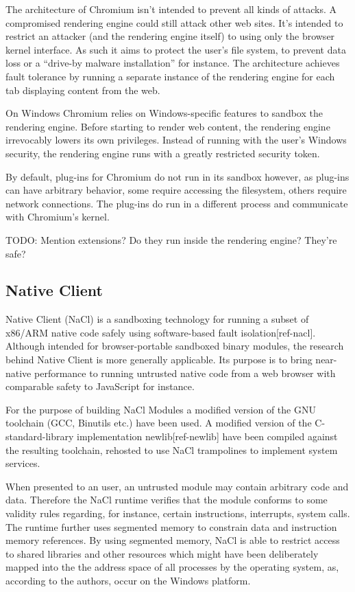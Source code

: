 The architecture of Chromium isn't intended to prevent all kinds of attacks.
A compromised rendering engine could still attack other web sites.
It's intended to restrict an attacker (and the rendering engine itself) to using
only the browser kernel interface. As such it aims to protect the user's file
system, to prevent data loss or a ``drive-by malware installation'' for
instance. The architecture achieves fault tolerance by running a separate
instance of the rendering engine for each tab displaying content from the web.

On Windows Chromium relies on Windows-specific features to sandbox the rendering
engine.
Before starting to render web content, the rendering engine irrevocably lowers
its own privileges.
Instead of running with the user's Windows security, the rendering engine runs
with a greatly restricted security token.

By default, plug-ins for Chromium do not run in its sandbox however, as
plug-ins can have arbitrary behavior, some require accessing the filesystem,
others require network connections.
The plug-ins do run in a different process and communicate with Chromium's
kernel.

TODO: Mention extensions? Do they run inside the rendering engine? They're safe?

\subsection {Native Client}

Native Client (NaCl) is a sandboxing technology for running a subset of x86/ARM
native code safely using software-based fault isolation[ref-nacl].
Although intended for browser-portable sandboxed binary modules, the research
behind Native Client is more generally applicable.
Its purpose is to bring near-native performance to running untrusted native code
from a web browser with comparable safety to JavaScript for instance.

For the purpose of building NaCl Modules a modified version of the GNU toolchain
(GCC, Binutils etc.) have been used. A modified version of the
C-standard-library implementation newlib[ref-newlib] have been compiled against
the resulting toolchain, rehosted to use NaCl trampolines to implement system
services.

When presented to an user, an untrusted module may contain arbitrary code and
data.
Therefore the NaCl runtime verifies that the module conforms to some validity
rules regarding, for instance, certain instructions, interrupts, system calls.
The runtime further uses segmented memory to constrain data and instruction
memory references.
By using segmented memory, NaCl is able to restrict access to shared libraries
and other resources which might have been deliberately mapped into the the
address space of all processes by the operating system, as, according to the
authors, occur on the Windows platform.

